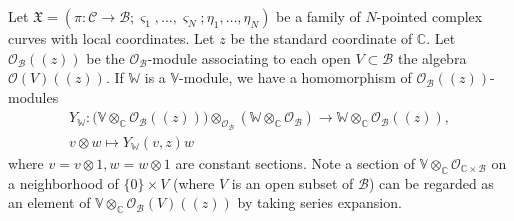 \documentclass[12pt,a4paper,notitlepage]{report}
\theoremstyle{definition}
\theoremstyle{plain}
\newcommand{\fk}{\mathfrak}
\newcommand{\mc}{\mathcal}
\newcommand{\scr}{\mathscr}
\newcommand{\sgm}{\varsigma}
\newcommand{\Vbb}{\mathbb V}
\newcommand{\Wbb}{\mathbb W}
\newcommand{\Cbb}{\mathbb C}
\numberwithin{equation}{section}
\begin{document}
Let $\fk X=(\pi:\mc C\rightarrow\mc B;\sgm_1,\dots,\sgm_N;\eta_1,\dots,\eta_N)$ be a family of $N$-pointed complex curves with local coordinates. Let $z$ be the standard coordinate of $\Cbb$. Let $\scr O_{\mc B}((z))$ be the $\scr O_{\mc B}$-module associating to each open $V\subset\mc B$ the algebra $\scr O(V)((z))$. If $\Wbb$ is a $\Vbb$-module, we have a homomorphism of $\scr O_{\mc B}((z))$-modules \index{Y@$Y,Y_\Wbb$}
\begin{gather}
Y_\Wbb:\big(\Vbb\otimes_\Cbb\scr O_{\mc B}((z))\big)\otimes_{\scr O_{\mc B}} (\Wbb\otimes_\Cbb\scr O_{\mc B})\rightarrow \Wbb\otimes_\Cbb\scr O_{\mc B}((z)),\nonumber\\
v\otimes w\mapsto Y_{\Wbb}(v,z)w 
\end{gather}
where $v=v\otimes 1,w=w\otimes 1$ are constant sections. Note a section of $\Vbb\otimes_\Cbb\scr O_{\Cbb\times\mc B}$ on a neighborhood of $\{0\}\times V$ (where $V$ is an open subset of $\mc B$) can be regarded as an element of $\Vbb\otimes_\Cbb\scr O_{\mc B}(V)((z))$ by taking series expansion.
\end{document}
